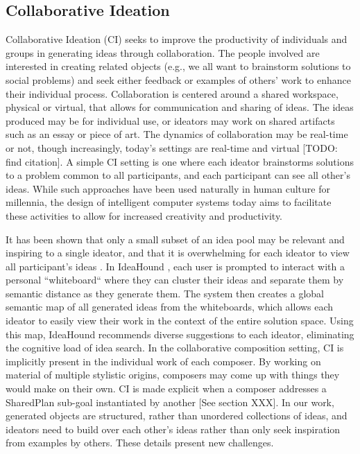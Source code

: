 \documentclass[final,authoryear,5p,times,twocolumn]{elsarticle}
\begin{document}
\subsection{Collaborative Ideation}
Collaborative Ideation (CI) seeks to improve the productivity of individuals and groups in generating ideas through collaboration. The people involved are interested in creating related objects (e.g., we all want to brainstorm solutions to social problems) and seek either feedback or examples of others' work to enhance their individual process. Collaboration is centered around a shared workspace, physical or virtual, that allows for communication and sharing of ideas. The ideas produced may be for individual use, or ideators may work on shared artifacts such as an essay or piece of art. The dynamics of collaboration may be real-time or not, though increasingly, today's settings are real-time and virtual [TODO: find citation]. A simple CI setting is one where each ideator brainstorms solutions to a problem common to all participants, and each participant can see all other's ideas. While such approaches have been used naturally in human culture for millennia, the design of intelligent computer systems today aims to facilitate these activities to allow for increased creativity and productivity. 

It has been shown that only a small subset of an idea pool may be relevant and inspiring to a single ideator, and that it is overwhelming for each ideator to view all participant's ideas \citep{siangliulue2015toward}. In IdeaHound \citep{siangliulue2016ideahound}, each user is prompted to interact with a personal ``whiteboard`` where they can cluster their ideas and separate them by semantic distance as they generate them. The system then creates a global semantic map of all generated ideas from the whiteboards, which allows each ideator to easily view their work in the context of the entire solution space. Using this map, IdeaHound recommends diverse suggestions to each ideator, eliminating the cognitive load of idea search. In the collaborative composition setting, CI is implicitly present in the individual work of each composer. By working on material of multiple stylistic origins, composers may come up with things they would make on their own. CI is made explicit when a composer addresses a SharedPlan sub-goal instantiated by another [See section XXX]. In our work, generated objects are structured, rather than unordered collections of ideas, and ideators need to build over each other's ideas rather than only seek inspiration from examples by others. These details present new challenges.
\end{document}
